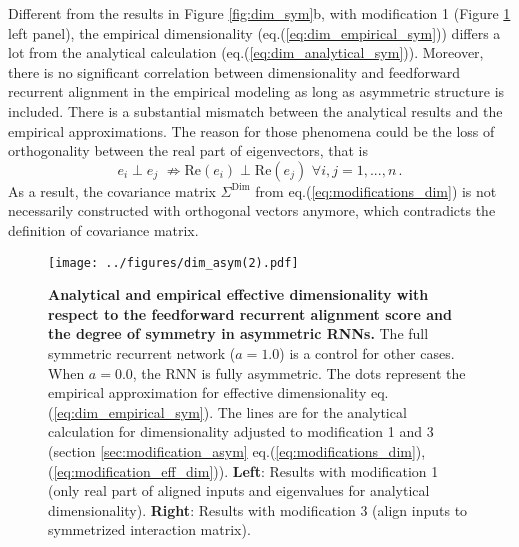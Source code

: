 \documentclass[11pt]{article}
\begin{document}
	Different from the results in Figure \ref{fig:dim_sym}b, with modification 1 (Figure \ref{fig:dim_asym} left panel), the empirical dimensionality (eq.(\ref{eq:dim_empirical_sym})) differs a lot from the analytical calculation (eq.(\ref{eq:dim_analytical_sym})). Moreover, there is no significant correlation between dimensionality and feedforward recurrent alignment in the empirical modeling as long as asymmetric structure is included. There is a substantial mismatch between the analytical results and the empirical approximations. The reason for those phenomena could be the loss of orthogonality between the real part of eigenvectors, that is 
	\begin{equation}
		e_i \perp e_j  \, \, \nRightarrow \text{Re}(e_i) \perp \text{Re}(e_j) \, \, \forall i, j = 1, ..., n \, .
	\end{equation}
	As a result, the covariance matrix $\Sigma^{\text{Dim}}$ from eq.(\ref{eq:modifications_dim}) is not necessarily constructed with orthogonal vectors anymore, which contradicts the definition of covariance matrix. 
	
		\begin{figure}[H]
			\centering
			\texttt{[image: ../figures/dim\_asym(2).pdf]}
			\caption[Analytical and empirical effective dimensionality with respect to the feedforward recurrent alignment score and the degree of symmetry in asymmetric RNNs]{\textbf{Analytical and empirical effective dimensionality with respect to the feedforward recurrent alignment score and the degree of symmetry in asymmetric RNNs.} The full symmetric recurrent network ($a = 1.0$) is a control for other cases. When $a = 0.0$, the RNN is fully asymmetric. The dots represent the empirical approximation for effective dimensionality eq.(\ref{eq:dim_empirical_sym}). The lines are for the analytical calculation for dimensionality adjusted to modification 1 and 3 (section \ref{sec:modification_asym} eq.(\ref{eq:modifications_dim}), (\ref{eq:modification_eff_dim})). \textbf{Left}: Results with modification 1 (only real part of aligned inputs and eigenvalues for analytical dimensionality). \textbf{Right}: Results with modification 3 (align inputs to symmetrized interaction matrix).}
			\label{fig:dim_asym}
		\end{figure}
	
\end{document}
